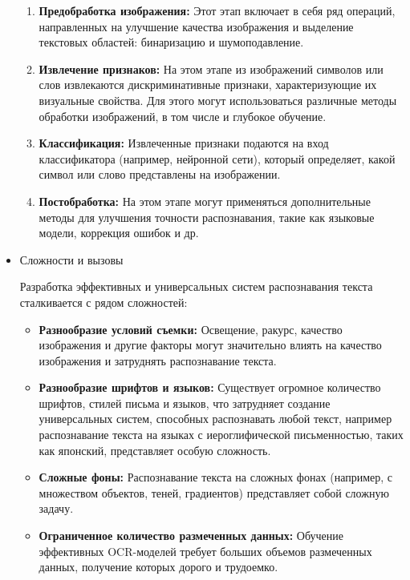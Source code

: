 \begin{itemize}
    \begin{enumerate}
        \item \textbf{Предобработка изображения:}  Этот  этап  включает  в  себя  ряд  операций,  направленных  на  улучшение  качества  изображения  и  выделение  текстовых  областей:  бинаризацию и  шумоподавление.
        \item \textbf{Извлечение признаков:}  На  этом  этапе  из  изображений  символов  или  слов  извлекаются  дискриминативные  признаки,  характеризующие  их  визуальные  свойства.  Для  этого  могут  использоваться  различные  методы  обработки  изображений,  в  том  числе  и  глубокое  обучение. 
        \item \textbf{Классификация:}  Извлеченные  признаки  подаются  на  вход  классификатора  (например,  нейронной  сети),  который  определяет,  какой  символ  или  слово  представлены  на  изображении. 
        \item \textbf{Постобработка:}  На  этом  этапе  могут  применяться  дополнительные  методы  для  улучшения  точности  распознавания,  такие  как  языковые  модели,  коррекция  ошибок  и  др. 
    \end{enumerate}

    \item{Сложности и вызовы}

    Разработка  эффективных  и  универсальных  систем  распознавания  текста  сталкивается  с  рядом  сложностей:

    \begin{itemize}
        \item \textbf{Разнообразие  условий  съемки:}  Освещение,  ракурс,  качество  изображения  и  другие  факторы  могут  значительно  влиять  на  качество  изображения  и  затруднять  распознавание  текста. 
        \item \textbf{Разнообразие  шрифтов  и  языков:}  Существует  огромное  количество  шрифтов,  стилей  письма  и  языков,  что  затрудняет  создание  универсальных  систем,  способных  распознавать  любой  текст, например распознавание  текста на  языках  с  иероглифической  письменностью,  таких как  японский,  представляет  особую  сложность. 
        \item \textbf{Сложные  фоны:}  Распознавание  текста  на  сложных  фонах  (например,  с  множеством  объектов,  теней,  градиентов)  представляет  собой  сложную  задачу.
        \item \textbf{Ограниченное количество размеченных данных:}  Обучение  эффективных  OCR-моделей требует  больших объемов размеченных данных,  получение которых  дорого  и трудоемко. 
    \end{itemize}
\end{itemize}
